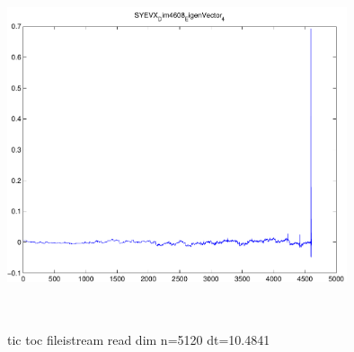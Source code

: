 \documentclass[9pt]{article}
\theoremstyle{plain}
\theoremstyle{definition}
\theoremstyle{remark}
\numberwithin{equation}{section}
\begin{document}
\includegraphics[width=10.0cm,height=10.0cm]{SYEVX_Dim4608_EigenVector_4.pdf}

tic toc fileistream read dim n=5120 dt=10.4841
\end{document}

